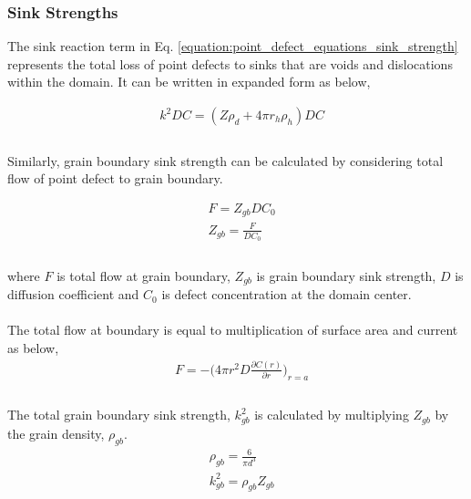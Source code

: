 \documentclass[a4paper]{article}
\begin{document}
    \subsubsection{Sink Strengths} \hspace{10pt}
    The sink reaction term in Eq. \ref{equation:point_defect_equations_sink_strength} represents the total loss of point defects to sinks that are voids and dislocations within the domain. It can be written in expanded form as below,

    \begin{equation}
      \begin{aligned}
        &k^2DC=(Z\rho_d+4\pi r_h\rho_h)DC\\
      \end{aligned}
    \end{equation}\\
    Similarly, grain boundary sink strength can be calculated by considering total flow of point defect to grain boundary.

    \begin{equation}
      \begin{aligned}
        &F=Z_{gb}DC_0\\
        &Z_{gb}=\frac{F}{DC_0}\\
      \end{aligned}
      \end{equation}\\

    where ${F}$ is total flow at grain boundary, ${Z_{gb}}$ is grain boundary sink strength, ${D}$ is diffusion coefficient and ${C_0}$ is defect concentration at the domain center.\\\\
    The total flow at boundary is equal to multiplication of surface area and current as below,\\

    \begin{equation}
      \begin{aligned}
        &F=-\bigg(4\pi r^2D\frac{\partial C(r)}{\partial r}\bigg)_{r=a}\\
      \end{aligned}
    \end{equation}\\
    The total grain boundary sink strength, ${k^2_{gb}}$ is calculated by multiplying ${Z_{gb}}$ by the grain density, ${\rho_{gb}}$.\cite{heald1977}
    \begin{equation}
      \begin{aligned}
        &\rho_{gb}=\frac{6}{\pi d^3}\\
        &k^2_{gb}=\rho_{gb}Z_{gb}\\
      \end{aligned}
    \end{equation}
\end{document}
